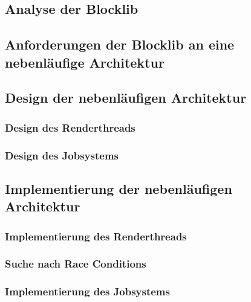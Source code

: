 \documentclass[12pt,a4paper,listof=totocnumbered,parskip=half,numbers=noenddot]{scrartcl}
\begin{document}
\subsection{Analyse der Blocklib}\label{sec:blocklibAnalyse}


\subsection{Anforderungen der Blocklib an eine nebenläufige Architektur}\label{sec:anforderungen}


\subsection{Design der nebenläufigen Architektur}

\pagebreak
\subsubsection{Design des Renderthreads}\label{sec:desgignRenderthread}

\subsubsection{Design des Jobsystems}\label{sec:desgignJobsystem}


\subsection{Implementierung der nebenläufigen Architektur}

\subsubsection{Implementierung des Renderthreads}


\subsubsection{Suche nach Race Conditions}

\subsubsection{Implementierung des Jobsystems}

\end{document}
